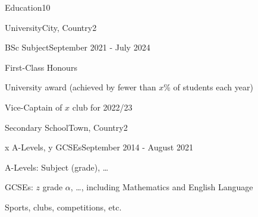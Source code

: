 \documentclass[10pt,a4paper]{CV}
\begin{document}

\begin{Section}{Education}{10}
    \begin{Institution}{University}{City, Country}{2}
        \begin{Position}{BSc Subject}{September 2021 - July 2024}
            \item First-Class Honours
            \item University award (achieved by fewer than $x$\% of students each year)
            \item Vice-Captain of $x$ club for 2022/23
        \end{Position}
    \end{Institution}

    \begin{Institution}{Secondary School}{Town, Country}{2}
        \begin{Position}{x A-Levels, y GCSEs}{September 2014 - August 2021}
            \item A-Levels: Subject (grade), \dots
            \item GCSEs: $z$ grade $\alpha$, \dots, including Mathematics and English Language
            \item Sports, clubs, competitions, etc.
        \end{Position}
    \end{Institution}
\end{Section}
\end{document}
